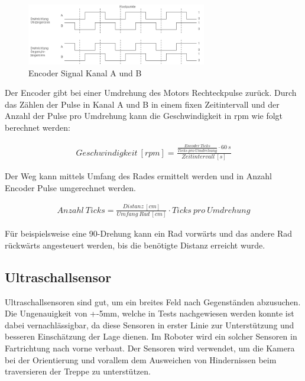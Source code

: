\begin{figure}[h]
  \includegraphics[width=0.7\textwidth]{img/Elektronik/quadrature.png}
  \centering
  \caption{Encoder Signal Kanal A und B}
  \label{fig:encoder-sig}
\end{figure}

Der Encoder gibt bei einer Umdrehung des Motors Rechteckpulse zurück. Durch das Zählen der Pulse in Kanal A und B in einem fixen Zeitintervall und der Anzahl der Pulse pro Umdrehung kann die Geschwindigkeit in rpm wie folgt berechnet werden:

\begin{align}
    Geschwindigkeit\ [rpm] = \frac{\frac{Encoder\ Ticks}{Ticks\ pro\ Umdrehung} \cdot 60\ s}{Zeitintervall\ [s]}
\end{align}

Der Weg kann mittels Umfang des Rades ermittelt werden und in Anzahl Encoder Pulse umgerechnet werden.

\begin{align}
    Anzahl\ Ticks = \frac{Distanz\ [cm]}{Umfang\ Rad\ [cm]} \cdot Ticks\ pro\ Umdrehung
\end{align}

Für beispielsweise eine 90\textdegree-Drehung kann ein Rad vorwärts und das andere Rad rückwärts angesteuert werden, bis die benötigte Distanz erreicht wurde. 


\subsection{Ultraschallsensor}

Ultraschallsensoren sind gut, um ein breites Feld nach Gegenständen abzusuchen. Die Ungenauigkeit von +-5mm, welche in Tests nachgewiesen werden konnte ist dabei vernachlässigbar, da diese Sensoren in erster Linie zur Unterstützung und besseren Einschätzung der Lage dienen.
Im Roboter wird ein solcher Sensoren in Fartrichtung nach vorne verbaut. Der Sensoren wird verwendet, um die Kamera bei der Orientierung und vorallem dem Ausweichen von Hindernissen beim traversieren der Treppe zu unterstützen.


